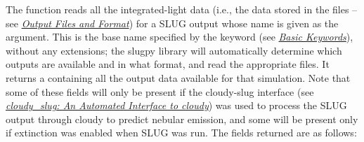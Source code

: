 \documentclass[letterpaper,10pt,english]{sphinxmanual}
\begin{document}
The  function reads all the integrated-light data (i.e., the data stored in the  files -- see {\hyperref[output:sec\string-output]{\emph{Output Files and Format}}}) for a SLUG output whose name is given as the argument. This is the base name specified by the  keyword (see {\hyperref[parameters:ssec\string-basic\string-keywords]{\emph{Basic Keywords}}}), without any extensions; the slugpy library will automatically determine which outputs are available and in what format, and read the appropriate files. It returns a  containing all the output data available for that simulation. Note that some of these fields will only be present if the cloudy-slug interface (see {\hyperref[cloudy:sec\string-cloudy\string-slug]{\emph{cloudy\_slug: An Automated Interface to cloudy}}}) was used to process the SLUG output through cloudy to predict nebular emission, and some will be present only if extinction was enabled when SLUG was run. The fields returned are as follows:
\end{document}
